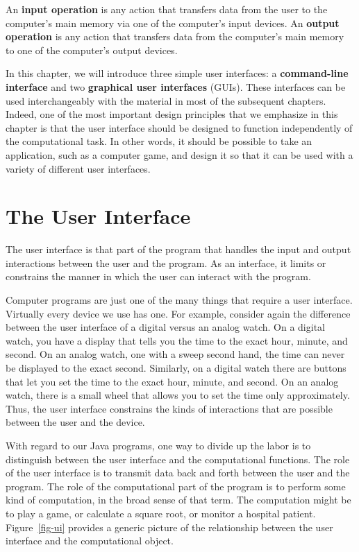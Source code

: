 An {\bf input operation} is any action that transfers data from the
user to the computer's main memory via one of the computer's input
devices. An {\bf output operation} is any action that transfers data
from the computer's main memory to one of the computer's output
devices. 

In this chapter, we will introduce three simple user interfaces: a {\bf
command-line interface} and two {\bf graphical user interfaces}
(GUIs).  These interfaces can be used interchangeably with the
material in most of the subsequent chapters. Indeed, one of the most
important design principles that we emphasize in this chapter is that
the user interface should be designed to function independently of the
computational task. In other words, it should be possible to take an
application, such as a computer game, and design it so that it can be
used with a variety of different user interfaces.  

\section{The User Interface}

The user interface is that part of the program that handles the
input and output interactions between the user and the program.  As an
interface, it limits or constrains the manner in which the user can
interact with the program.

Computer programs are just one of the many things that require a user
interface.  Virtually every device we use has one. For example,
consider again the difference between the user interface of a digital
versus an analog watch. On a digital watch, you have a display that
tells you the time to the exact hour, minute, and second. On an analog
watch, one with a sweep second hand, the time can never be displayed
to the exact second. Similarly, on a digital watch there are buttons
that let you set the time to the exact hour, minute, and second. On an
analog watch, there is a small wheel that allows you to set the time
only approximately.  Thus, the user interface constrains the kinds of
interactions that are possible between the user and the device.

With regard to our Java programs, one way to divide up the labor is to
distinguish between the user interface and the computational
functions. The role of the user interface is to transmit data back and
forth between the user and the program.  The role of the computational
part of the program is to perform some kind of computation, in the
broad sense of that term. The computation might be to play a game, or
calculate a square root, or monitor a hospital patient.
Figure~\ref{fig-ui} provides a generic picture of the relationship
between the user interface and the computational object.

